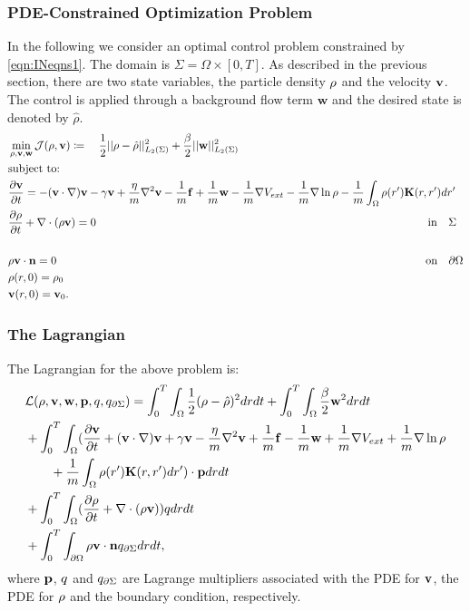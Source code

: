
\subsubsection{PDE-Constrained Optimization Problem}
In the following we consider an optimal control problem constrained by \eqref{eqn:INeqns1}. 
The domain is $\Sigma=\Omega \times [0,T]$. As described in the previous section, there are two state variables, the particle density $\rho$ and the velocity $\mathbf{v}$. The control is applied through a background flow term $\mathbf{w}$ and the desired state is denoted by $\hat \rho$. 
\begin{align*}
&\min_{\rho,\mathbf{v},\mathbf{w} } \mathcal J(\rho,\mathbf{v}) \coloneqq \quad \frac{1}{2}||\rho - \hat {\rho}||_{L_2(\Sigma)}^2  +\frac{\beta}{2}||\mathbf{w}||_{L_2(\Sigma)}^2\\
&\text{subject to:}\\
& \frac{\partial \mathbf{v}}{\partial t}= -  (\mathbf{v} \cdot \nabla)\mathbf{v} - \gamma  \mathbf{v} + \frac{\eta}{m} \nabla^2 \mathbf{v}  -\frac{1}{m}\mathbf{f} +\frac{1}{m}\mathbf{w} -\frac{1}{m} \nabla V_{ext} - \frac{1}{m}\nabla \ln \rho  -\frac{1}{m}\int_\Omega \rho(r') \mathbf{K}(r,r')dr' \\
&\frac{\partial \rho}{\partial t} + \nabla \cdot (\rho \mathbf{v})=0 \qquad\qquad \qquad\qquad\qquad\quad \quad\quad\qquad \qquad\qquad \qquad\qquad\qquad\quad \qquad\quad\ \ \text{in} \quad \Sigma\\
\\
&\rho \mathbf{v} \cdot \mathbf{n} =0\qquad\qquad \qquad\qquad\qquad\qquad\qquad\qquad\qquad \qquad\qquad \qquad\qquad\qquad \qquad\qquad\quad  \text{on} \quad \partial  \Omega\\
& \rho(r,0)=\rho_0\\
& \mathbf{v}(r,0)=\mathbf{v}_0.
\end{align*}

\subsubsection*{The Lagrangian}
The Lagrangian for the above problem is:
\begin{align*}
&\mathcal{L}(\rho,\mathbf{v},\mathbf{w},\mathbf{p},q,{q}_{\partial \Sigma}) = \int_0^T \int_\Omega  \frac{1}{2}(\rho - \hat {\rho})^2 drdt  +\int_0^T \int_\Omega  \frac{\beta}{2}\mathbf{w}^2 drdt\\
&+ \int_0^T \int_\Omega (\frac{\partial \mathbf{v}}{\partial t}+  (\mathbf{v} \cdot \nabla)\mathbf{v} + \gamma  \mathbf{v} - \frac{\eta}{m} \nabla^2 \mathbf{v}  +\frac{1}{m}\mathbf{f} -\frac{1}{m}\mathbf{w} +\frac{1}{m} \nabla V_{ext} + \frac{1}{m}\nabla \ln \rho  \\
&\quad \quad +\frac{1}{m}\int_\Omega \rho(r') \mathbf{K}(r,r')dr') \cdot \mathbf{p} dr dt\\
& + \int_0^T \int_\Omega (\frac{\partial \rho}{\partial t} + \nabla \cdot (\rho \mathbf{v})) q dr dt\\ 
& +\int_0^T \int_{\partial\Omega} \rho \mathbf{v} \cdot \mathbf{n} {q}_{\partial \Sigma} dr dt,
\end{align*}
where $\mathbf{p}$, $q$ and ${q}_{\partial \Sigma}$ are Lagrange multipliers associated with the PDE for $\mathbf{v}$, the PDE for $\rho$ and the boundary condition, respectively.



